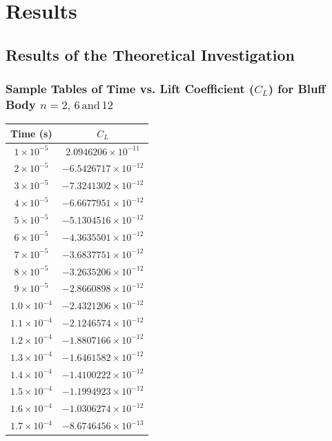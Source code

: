 \section{Results}
\subsection{Results of the Theoretical Investigation}

\subsubsection{Sample Tables of Time vs. Lift Coefficient ($C_L$) for Bluff Body $n=2,\,6\,\text{and}\,12$}

\begin{table}[H]
	\centering
	\renewcommand{\arraystretch}{1.3}
	\begin{tabular}{|c|c|}
		\hline
		\textbf{Time (s)} & \textbf{$C_L$} \\
		\hline
		$1 \times 10^{-5}$ & $2.0946206 \times 10^{-11}$ \\
		$2 \times 10^{-5}$ & $-6.5426717 \times 10^{-12}$ \\
		$3 \times 10^{-5}$ & $-7.3241302 \times 10^{-12}$ \\
		$4 \times 10^{-5}$ & $-6.6677951 \times 10^{-12}$ \\
		$5 \times 10^{-5}$ & $-5.1304516 \times 10^{-12}$ \\
		$6 \times 10^{-5}$ & $-4.3635501 \times 10^{-12}$ \\
		$7 \times 10^{-5}$ & $-3.6837751 \times 10^{-12}$ \\
		$8 \times 10^{-5}$ & $-3.2635206 \times 10^{-12}$ \\
		$9 \times 10^{-5}$ & $-2.8660898 \times 10^{-12}$ \\
		$1.0 \times 10^{-4}$ & $-2.4321206 \times 10^{-12}$ \\
		$1.1 \times 10^{-4}$ & $-2.1246574 \times 10^{-12}$ \\
		$1.2 \times 10^{-4}$ & $-1.8807166 \times 10^{-12}$ \\
		$1.3 \times 10^{-4}$ & $-1.6461582 \times 10^{-12}$ \\
		$1.4 \times 10^{-4}$ & $-1.4100222 \times 10^{-12}$ \\
		$1.5 \times 10^{-4}$ & $-1.1994923 \times 10^{-12}$ \\
		$1.6 \times 10^{-4}$ & $-1.0306274 \times 10^{-12}$ \\
		$1.7 \times 10^{-4}$ & $-8.6746456 \times 10^{-13}$ \\

\end{tabular}
\end{table}
